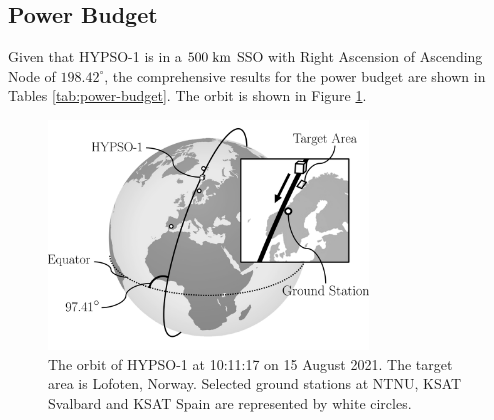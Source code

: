 \subsection{Power Budget}
Given that HYPSO-1 is in a $500 \hspace{3pt} \rm{km}$ SSO with Right Ascension of Ascending Node of $198.42^{\circ}$, the comprehensive results for the power budget are shown in Tables \ref{tab:power-budget}. The orbit is shown in Figure \ref{fig:orbit_hypso}.
\begin{figure}[tbhp]
  \begin{center}
    \includegraphics[width=85mm,angle=0]{figs/orbit_hypso.png}
    \caption{The orbit of HYPSO-1 at 10:11:17 on 15 August 2021. The target area is Lofoten, Norway. Selected ground stations at NTNU, KSAT Svalbard and KSAT Spain are represented by white circles.}
    \label{fig:orbit_hypso}
\end{center}
\end{figure}
